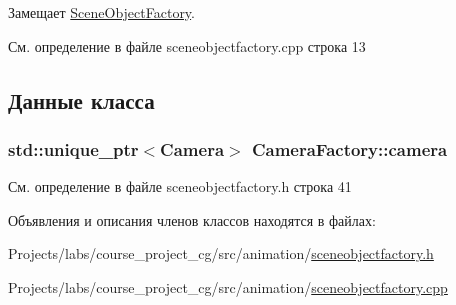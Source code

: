 Замещает \hyperlink{class_scene_object_factory_a9b90daaddbc34b747c072f770bc6b993}{Scene\+Object\+Factory}.



См. определение в файле sceneobjectfactory.\+cpp строка 13



\subsection{Данные класса}
\subsubsection[{\texorpdfstring{camera}{camera}}]{\setlength{\rightskip}{0pt plus 5cm}std\+::unique\+\_\+ptr$<${\bf Camera}$>$ Camera\+Factory\+::camera\hspace{0.3cm}{\ttfamily [private]}}\hypertarget{class_camera_factory_ad1e2114f133f8489e790a4f42b377de3}{}\label{class_camera_factory_ad1e2114f133f8489e790a4f42b377de3}


См. определение в файле sceneobjectfactory.\+h строка 41



Объявления и описания членов классов находятся в файлах\+:\begin{DoxyCompactItemize}
\item 
Projects/labs/course\+\_\+project\+\_\+cg/src/animation/\hyperlink{sceneobjectfactory_8h}{sceneobjectfactory.\+h}\item 
Projects/labs/course\+\_\+project\+\_\+cg/src/animation/\hyperlink{sceneobjectfactory_8cpp}{sceneobjectfactory.\+cpp}\end{DoxyCompactItemize}
